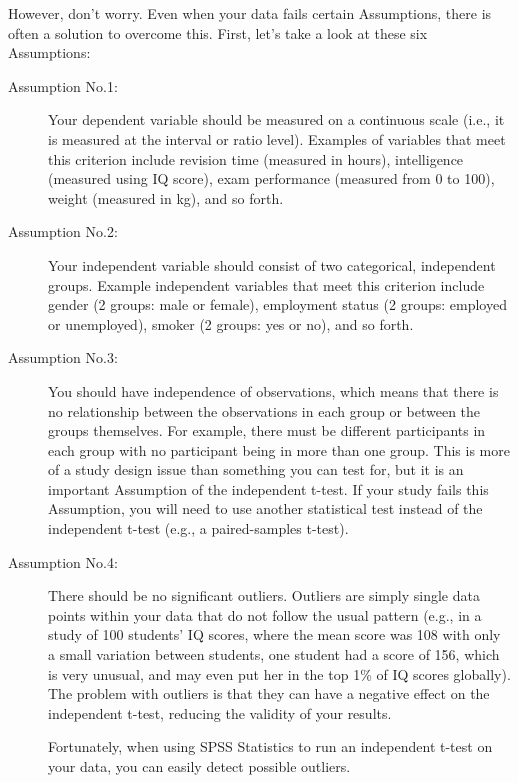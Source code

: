 \documentclass[]{article}
\begin{document}
However, don't worry. Even when your data fails certain Assumptions, there is often a solution to overcome this. First, let's take a look at these six Assumptions:
\begin{description}
	\item[Assumption No.1:] Your dependent variable should be measured on a continuous scale (i.e., it is measured at the interval or ratio level). Examples of variables that meet this criterion include revision time (measured in hours), intelligence (measured using IQ score), exam performance (measured from 0 to 100), weight (measured in kg), and so forth.
	\item[Assumption No.2:] Your independent variable should consist of two categorical, independent groups. Example independent variables that meet this criterion include gender (2 groups: male or female), employment status (2 groups: employed or unemployed), smoker (2 groups: yes or no), and so forth.
	\item[Assumption No.3:] You should have independence of observations, which means that there is no relationship between the observations in each group or between the groups themselves. For example, there must be different participants in each group with no participant being in more than one group. This is more of a study design issue than something you can test for, but it is an important Assumption of the independent t-test. If your study fails this Assumption, you will need to use another statistical test instead of the independent t-test (e.g., a paired-samples t-test). 
	
	\item[Assumption No.4:] There should be no significant outliers. 
	Outliers are simply single data points within your data that do not follow the usual pattern (e.g., in a study of 100 students' IQ scores, where the mean score was 108 with only a small variation between students, one student had a score of 156, which is very unusual, and may even put her in the top 1\% of IQ scores globally). The problem with outliers is that they can have a negative effect on the independent t-test, reducing the validity of your results. 
	
	Fortunately, when using SPSS Statistics to run an independent t-test on your data, you can easily detect possible outliers. 
	

\end{description}
\end{document}
